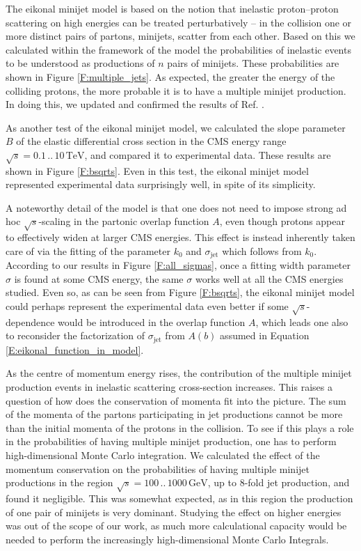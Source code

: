 \documentclass[a4paper, twoside, english, 12pt]{report}
\begin{document}
The eikonal minijet model is based on the notion that inelastic proton--proton scattering on high energies can be treated perturbatively -- in the collision one or more distinct pairs of partons, minijets, scatter from each other. Based on this we calculated within the framework of the model the probabilities of inelastic events to be understood as productions of $n$ pairs of minijets. These probabilities are shown in Figure \ref{F:multiple_jets}. As expected, the greater the energy of the colliding protons, the more probable it is to have a multiple minijet production. In doing this, we updated and confirmed the results of Ref. \cite{xnw}.

As another test of the eikonal minijet model, we calculated the slope parameter $B$ of the elastic differential cross section in the CMS energy range $\sqrt{s}=0.1\,..\,10\,\text{TeV}$, and compared it to experimental data. These results are shown in Figure \ref{F:bsqrts}. Even in this test, the eikonal minijet model represented experimental data surprisingly well, in spite of its simplicity.

A noteworthy detail of the model is that one does not need to impose strong ad hoc $\sqrt{s}$-scaling in the partonic overlap function $A$, even though protons appear to effectively widen at larger CMS energies. This effect is instead inherently taken care of via the fitting of the parameter $k_0$ and $\sigma_{\text{jet}}$ which follows from $k_0$. According to our results in Figure \ref{F:all_sigmas}, once a fitting width parameter $\sigma$ is found at some CMS energy, the same $\sigma$ works well at all the CMS energies studied. Even so, as can be seen from Figure \ref{F:bsqrts}, the eikonal minijet model could perhaps represent the experimental data even better if some $\sqrt{s}$-dependence would be introduced in the overlap function $A$, which leads one also to reconsider the factorization of $\sigma_{\text{jet}}$ from $A(b)$ assumed in Equation \eqref{E:eikonal_function_in_model}.

As the centre of momentum energy rises, the contribution of the multiple minijet production events in inelastic scattering cross-section increases. This raises a question of how does the conservation of momenta fit into the picture. The sum of the momenta of the partons participating in jet productions cannot be more than the initial momenta of the protons in the collision. To see if this plays a role in the probabilities of having multiple minijet production, one has to perform high-dimensional Monte Carlo integration. We calculated the effect of the momentum conservation on the probabilities of having multiple minijet productions in the region $\sqrt{s}=100\,..\,1000\,\text{GeV}$, up to 8-fold jet production, and found it negligible. This was somewhat expected, as in this region the production of one pair of minijets is very dominant. Studying the effect on higher energies was out of the scope of our work, as much more calculational capacity would be needed to perform the increasingly high-dimensional Monte Carlo Integrals.
\end{document}
